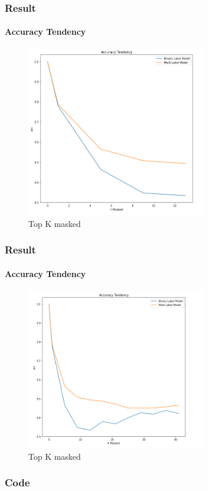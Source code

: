 \documentclass{beamer}
\begin{document}
\begin{frame}
    \frametitle{Result}
    \framesubtitle{Accuracy Tendency}
    \begin{figure}
        \centering
            \includegraphics[width=0.7\textwidth]{Accuracy Tendency.png}
            \caption{Top K masked}
            \label{fig:MaskedExample}
    \end{figure}
\end{frame}

\begin{frame}
    \frametitle{Result}
    \framesubtitle{Accuracy Tendency}
    \begin{figure}
        \centering
            \includegraphics[width=0.7\textwidth]{Accuracy Tendency2.png}
            \caption{Top K masked}
            \label{fig:MaskedExample}
    \end{figure}
\end{frame}

\begin{frame}
    \frametitle{Code}

\end{frame}
\end{document}
